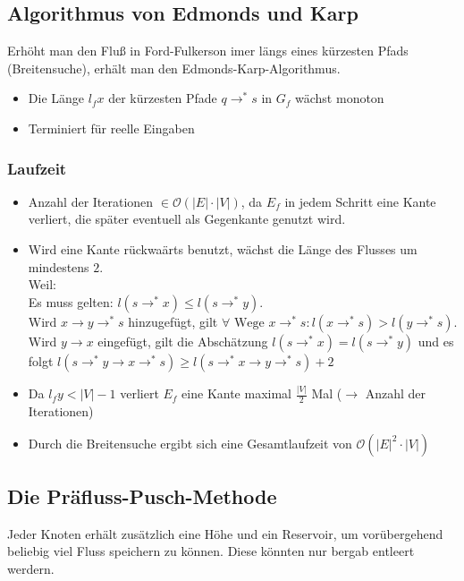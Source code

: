 \subsection{Algorithmus von Edmonds und Karp}
Erhöht man den Fluß in Ford-Fulkerson imer längs eines kürzesten Pfads (Breitensuche), erhält man den Edmonds-Karp-Algorithmus.

\begin{itemize}
	\item Die Länge \(l_f x\) der kürzesten Pfade \(q \rightarrow^* s\) in \(G_f\) wächst monoton
	\item Terminiert für reelle Eingaben
\end{itemize}

\subsubsection{Laufzeit}
\begin{itemize}
	\item Anzahl der Iterationen \(\in \mathcal{O}(|E| \cdot |V|)\), da \(E_f\) in jedem Schritt eine Kante verliert, die später eventuell als Gegenkante genutzt wird.
    \item Wird eine Kante rückwaärts benutzt, wächst die Länge des Flusses um mindestens \(2\).\\ Weil:\\
    Es muss gelten: $l(s \rightarrow^{\ast} x) \le l(s \rightarrow^{\ast} y)$.\\
    Wird $x \rightarrow y \rightarrow^{\ast} s$ hinzugefügt, gilt $\forall \text{ Wege } x \rightarrow^{\ast} s : l(x \rightarrow^{\ast} s) > l(y \rightarrow^{\ast} s)$.\\
    Wird $y \rightarrow x$ eingefügt, gilt die Abschätzung $l(s \rightarrow^{\ast} x) = l(s \rightarrow^{\ast} y)$ und es folgt $l(s \rightarrow^{\ast} y \rightarrow x \rightarrow^{\ast} s) \ge l(s \rightarrow^{\ast} x \rightarrow y \rightarrow^{\ast} s)+2$
	\item Da \(l_f y < |V|-1\) verliert \(E_f\) eine Kante maximal \(\frac{|V|}{2}\) Mal (\(\rightarrow\) Anzahl der Iterationen)
	\item Durch die Breitensuche ergibt sich eine Gesamtlaufzeit von \(\mathcal{O}(|E|^2 \cdot |V|)\)
\end{itemize}


\subsection{Die Präfluss-Pusch-Methode}
Jeder Knoten erhält zusätzlich eine Höhe und ein Reservoir, um vorübergehend beliebig viel Fluss speichern zu können. Diese könnten nur bergab entleert werdern.

